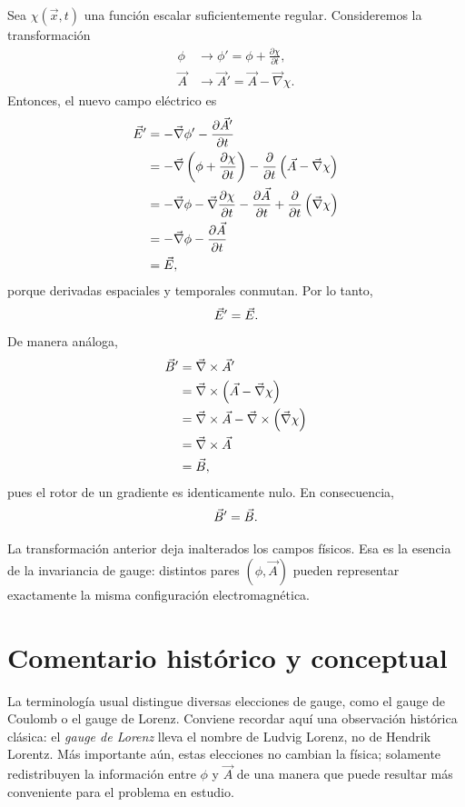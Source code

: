 \documentclass[../main.tex]{subfiles}
\begin{document}
Sea $\chi(\vec x,t)$ una función escalar suficientemente regular. Consideremos la transformación
\begin{align*}
    \phi &\rightarrow \phi' = \phi + \frac{\partial \chi}{\partial t}, \\
    \vec A &\rightarrow \vec A' = \vec A - \vec\nabla\chi.
\end{align*}
Entonces, el nuevo campo eléctrico es
\begin{align*}
    \vec{E}' &= -\vec\nabla \phi' - \frac{\partial \vec A'}{\partial t} \\
    &= -\vec\nabla\left(\phi + \frac{\partial \chi}{\partial t}\right) - \frac{\partial}{\partial t}\left(\vec A - \vec\nabla\chi\right) \\
    &= -\vec\nabla\phi - \vec\nabla\frac{\partial \chi}{\partial t} - \frac{\partial \vec A}{\partial t} + \frac{\partial}{\partial t}\left(\vec\nabla\chi\right) \\
    &= -\vec\nabla\phi - \frac{\partial \vec A}{\partial t} \\
    &= \vec{E},
\end{align*}
porque derivadas espaciales y temporales conmutan. Por lo tanto,
\begin{equation*}
    \vec{E}' = \vec{E}.
\end{equation*}
De manera análoga,
\begin{align*}
    \vec{B}' &= \vec\nabla\times\vec A' \\
    &= \vec\nabla\times\left(\vec A - \vec\nabla\chi\right) \\
    &= \vec\nabla\times\vec A - \vec\nabla\times\left(\vec\nabla\chi\right) \\
    &= \vec\nabla\times\vec A \\
    &= \vec{B},
\end{align*}
pues el rotor de un gradiente es identicamente nulo. En consecuencia,
\begin{equation*}
    \vec{B}' = \vec{B}.
\end{equation*}

La transformación anterior deja inalterados los campos físicos. Esa es la esencia de la invariancia de gauge: distintos pares $(\phi,\vec A)$ pueden representar exactamente la misma configuración electromagnética.

\section*{Comentario histórico y conceptual}
La terminología usual distingue diversas elecciones de gauge, como el gauge de Coulomb o el gauge de Lorenz. Conviene recordar aquí una observación histórica clásica: el \emph{gauge de Lorenz} lleva el nombre de Ludvig Lorenz, no de Hendrik Lorentz. Más importante aún, estas elecciones no cambian la física; solamente redistribuyen la información entre $\phi$ y $\vec A$ de una manera que puede resultar más conveniente para el problema en estudio.
\end{document}
